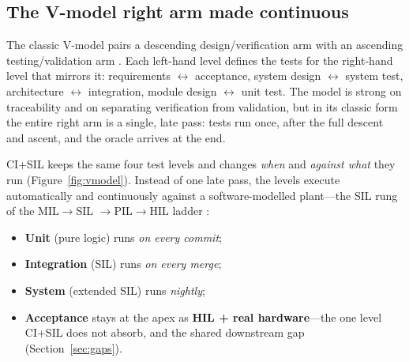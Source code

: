 \documentclass[11pt,a4paper]{article}
\begin{document}
\subsection{The V-model right arm made continuous}
\label{sec:continuous}

The classic V-model pairs a descending design/verification arm with an ascending
testing/validation arm \cite{qmsdoc2026,sheridan2026b}. Each left-hand level defines the tests
for the right-hand level that mirrors it: requirements $\leftrightarrow$ acceptance, system
design $\leftrightarrow$ system test, architecture $\leftrightarrow$ integration, module design
$\leftrightarrow$ unit test. The model is strong on traceability and on separating verification
from validation, but in its classic form the entire right arm is a single, late pass: tests run
once, after the full descent and ascent, and the oracle arrives at the end.

CI+SIL keeps the same four test levels and changes \emph{when} and \emph{against what} they run
(Figure~\ref{fig:vmodel}). Instead of one late pass, the levels execute automatically and
continuously against a software-modelled plant---the SIL rung of the MIL$\rightarrow$SIL
$\rightarrow$PIL$\rightarrow$HIL ladder \cite{opalrt2026,sheridan2026a}:

\begin{itemize}
  \item \textbf{Unit} (pure logic) runs \emph{on every commit};
  \item \textbf{Integration} (SIL) runs \emph{on every merge};
  \item \textbf{System} (extended SIL) runs \emph{nightly};
  \item \textbf{Acceptance} stays at the apex as \textbf{HIL + real hardware}---the one level
    CI+SIL does not absorb, and the shared downstream gap (Section~\ref{sec:gaps}).
\end{itemize}
\end{document}
